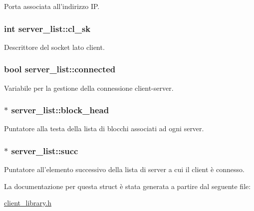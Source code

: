 Porta associata all'indirizzo IP. 

\hypertarget{structserver__list_79719d4ab0eee7769ccba74394c8c09b_79719d4ab0eee7769ccba74394c8c09b}{
\subsubsection[{cl\_\-sk}]{\setlength{\rightskip}{0pt plus 5cm}int {\bf server\_\-list::cl\_\-sk}}}
\label{structserver__list_79719d4ab0eee7769ccba74394c8c09b_79719d4ab0eee7769ccba74394c8c09b}


Descrittore del socket lato client. 

\hypertarget{structserver__list_4c9b2c2aaceed434fdb463dabfe487f4_4c9b2c2aaceed434fdb463dabfe487f4}{
\subsubsection[{connected}]{\setlength{\rightskip}{0pt plus 5cm}bool {\bf server\_\-list::connected}}}
\label{structserver__list_4c9b2c2aaceed434fdb463dabfe487f4_4c9b2c2aaceed434fdb463dabfe487f4}


Variabile per la gestione della connessione client-server. 

\hypertarget{structserver__list_7cef5477a059bde2cd16d5da85bdf62b_7cef5477a059bde2cd16d5da85bdf62b}{
\subsubsection[{block\_\-head}]{$\ast$ {\bf server\_\-list::block\_\-head}}}
\label{structserver__list_7cef5477a059bde2cd16d5da85bdf62b_7cef5477a059bde2cd16d5da85bdf62b}


Puntatore alla testa della lista di blocchi associati ad ogni server. 

\hypertarget{structserver__list_64bb0479e5e9c0e84bef62534b40495b_64bb0479e5e9c0e84bef62534b40495b}{
\subsubsection[{succ}]{$\ast$ {\bf server\_\-list::succ}}}
\label{structserver__list_64bb0479e5e9c0e84bef62534b40495b_64bb0479e5e9c0e84bef62534b40495b}


Puntatore all'elemento successivo della lista di server a cui il client è connesso. 



La documentazione per questa struct è stata generata a partire dal seguente file:\begin{CompactItemize}
\item 
\hyperlink{client__library_8h}{client\_\-library.h}\end{CompactItemize}
